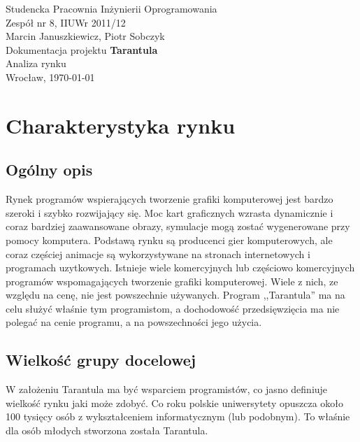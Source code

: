 \documentclass[11pt,leqno]{article}
\begin{document}
\begin{center}
\thispagestyle{empty}
{\Large Studencka Pracownia Inżynierii Oprogramowania}\\[0.5cm]
{\Large Zespół nr 8, IIUWr 2011/12}\\[2.5cm]

{Marcin Januszkiewicz, Piotr Sobczyk}\\[0.5cm]
{\huge Dokumentacja projektu \textbf{Tarantula}}\\[0.25cm]
{ Analiza rynku}\\[0.5cm]
\vfill
{\large Wrocław, \today}
\end{center}

\newpage
\tableofcontents
\newpage


\section{Charakterystyka rynku}

\subsection{Ogólny opis}
Rynek programów wspierających tworzenie grafiki komputerowej jest bardzo szeroki i szybko rozwijający się. Moc kart graficznych wzrasta dynamicznie i coraz
bardziej zaawansowane obrazy, symulacje mogą zostać wygenerowane przy pomocy komputera. Podstawą rynku są producenci gier komputerowych, ale coraz częściej
animacje są wykorzystywane na stronach internetowych i programach uzytkowych.
Istnieje wiele komercyjnych lub częściowo komercyjnych programów wspomagających tworzenie grafiki komputerowej. Wiele z nich, ze względu na cenę, 
nie jest powszechnie używanych. Program ,,Tarantula'' ma na celu służyć właśnie tym programistom, a dochodowość przedsięwzięcia ma nie polegać na cenie
programu, a na powszechności jego użycia.

\subsection{Wielkość grupy docelowej}
W założeniu Tarantula ma być wsparciem programistów, co jasno definiuje wielkość rynku jaki może zdobyć. Co roku polskie uniwersytety opuszcza około
100 tysięcy osób z wykształceniem informatycznym (lub podobnym). To właśnie dla osób młodych stworzona została Tarantula.
\end{document}
